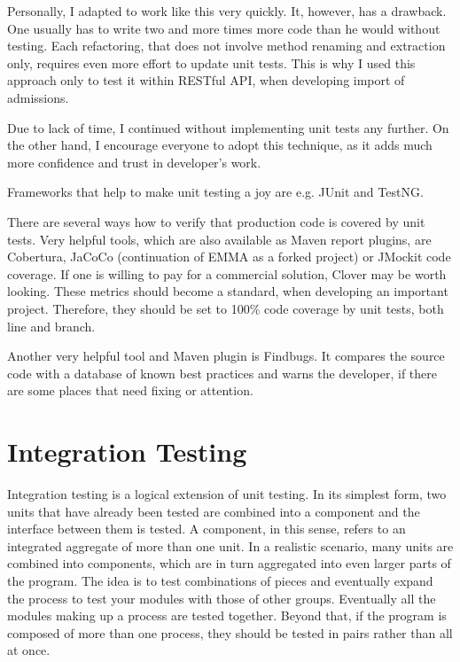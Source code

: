 	Personally, I adapted to work like this very quickly. It, however, has a drawback. One usually has to write two and
	more times more code than he would without testing. Each refactoring, that does not involve method renaming and
	extraction only, requires even more effort to update unit tests. This is why I used this approach only to test it
	within RESTful API, when developing import of admissions.
	
	Due to lack of time, I continued without implementing unit tests any further. On the other hand, I encourage everyone
	to adopt this technique, as it adds much more confidence and trust in developer's work.

	Frameworks that help to make unit testing a joy are e.g. JUnit and TestNG.
	
	There are several ways how to verify that production code is covered by unit tests. Very helpful tools, which are
	also available as Maven report plugins, are Cobertura, JaCoCo (continuation of EMMA as a forked project) or JMockit
	code coverage.
	If one is willing to pay for a commercial solution, Clover may be worth looking. These metrics should become a standard, when developing an important
	project. Therefore, they should be set to 100\% code coverage by unit tests, both line and branch.
	
	Another very helpful tool and Maven plugin is Findbugs. It compares the source code with a database of known best
	practices and warns the developer, if there are some places that need fixing or attention.

	\section{Integration Testing}
	
	\cite{msdnintegration}
	Integration testing is a logical extension of unit testing. In its simplest form, two units that have already been
	tested are combined into a component and the interface between them is tested. A component, in this sense, refers to an
	integrated aggregate of more than one unit. In a realistic scenario, many units are combined into components, which are
	in turn aggregated into even larger parts of the program. The idea is to test combinations of pieces and eventually
	expand the process to test your modules with those of other groups. Eventually all the modules making up a process are
	tested together. Beyond that, if the program is composed of more than one process, they should be tested in pairs
	rather than all at once.

